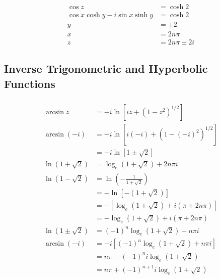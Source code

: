 \documentclass{article}
\begin{document}
\setcounter{subsubsection}{20}
\subsubsection{}

\begin{align*}
  \cos z                            & = \cosh 2         \\
  \cos x \cosh y - i \sin x \sinh y & = \cosh 2         \\
  y                                 & = \pm 2           \\
  x                                 & = 2 n \pi         \\
  z                                 & = 2 n \pi \pm 2 i
\end{align*}

\subsection{Inverse Trigonometric and Hyperbolic Functions}

\subsubsection{}

\begin{align*}
  \arcsin z            & = -i \ln [i z + (1 - z^2)^{1 / 2}]             \\
  \arcsin (-i)         & = -i \ln [i (-i) + (1 - (-i)^2)^{1 / 2}]       \\
                       & = -i \ln [1 \pm \sqrt{2}]                      \\
  \ln (1 + \sqrt{2})   & = \log_e (1 + \sqrt{2}) + 2 n \pi i            \\
  \ln (1 - \sqrt{2})   & = \ln \left( -\frac{1}{1 + \sqrt{2}} \right)   \\
                       & = -\ln [-(1 + \sqrt{2})]                       \\
                       & = -[\log_e (1 + \sqrt{2}) + i (\pi + 2 n \pi)] \\
                       & = -\log_e (1 + \sqrt{2}) + i (\pi + 2 n \pi)   \\
  \ln (1 \pm \sqrt{2}) & = (-1)^n \log_e (1 + \sqrt{2}) + n \pi i       \\
  \arcsin (-i)         & = -i [(-1)^n \log_e (1 + \sqrt{2}) + n \pi i]  \\
                       & = n \pi - (-1)^n i \log_e (1 + \sqrt{2})       \\
                       & = n \pi + (-1)^{n + 1} i \log_e (1 + \sqrt{2})
\end{align*}
\end{document}
